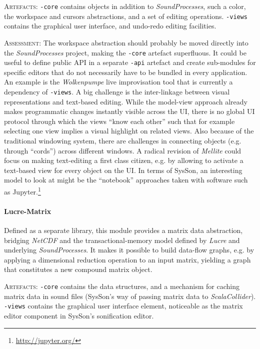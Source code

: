 \documentclass[11pt,a4paper]{article}
\newcommand{\software}[1]{\textit{#1}}
\newcommand{\sysson}[0]{SysSon}
\newcommand{\artefacts}[0]{\textsc{Artefacts:}}
\newcommand{\assessment}[0]{\textsc{Assessment:}}
\begin{document}
\artefacts{} \verb!-core! contains objects in addition to \software{SoundProcesses}, such a color, the workspace and cursors abstractions, and a set of editing operations. \verb!-views! contains the graphical user interface, and undo-redo editing facilities.

\assessment{} The workspace abstraction should probably be moved directly into the \software{SoundProcesses} project, making the \verb!-core! artefact superfluous. It could be useful to define public API in a separate \verb!-api! artefact and create sub-modules for specific editors that do not necessarily have to be bundled in every application. An example is the \software{Wolkenpumpe} live improvisation tool that is currently a dependency of \verb!-views!.
A big challenge is the inter-linkage between visual representations and text-based editing. While the model-view approach already makes programmatic changes instantly visible across the UI, there is no global UI protocol through which the views ``know each other'' such that for example selecting one view implies a visual highlight on related views. Also because of the traditional windowing system, there are challenges in connecting objects (e.g. through ``cords'') across different windows. A radical revision of \software{Mellite} could focus on making text-editing a first class citizen, e.g. by allowing to activate a text-based view for every object on the UI. In terms of \sysson{}, an interesting model to look at might be the ``notebook'' approaches taken with software such as Jupyter.\footnote{\url{http://jupyter.org/}}

\paragraph{Lucre-Matrix}

Defined as a separate library, this module provides a matrix data abstraction, bridging \software{NetCDF} and the transactional-memory model defined by \software{Lucre} and underlying \software{SoundProcesses}. It makes it possible to build data-flow graphs, e.g. by applying a dimensional reduction operation to an input matrix, yielding a graph that constitutes a new compound matrix object.

\artefacts{} \verb!-core! contains the data structures, and a mechanism for caching matrix data in sound files (\sysson{}'s way of passing matrix data to \software{ScalaCollider}). \verb!-views! contains the graphical user interface element, noticeable as the matrix editor component in \sysson{}'s sonification editor.
\end{document}
